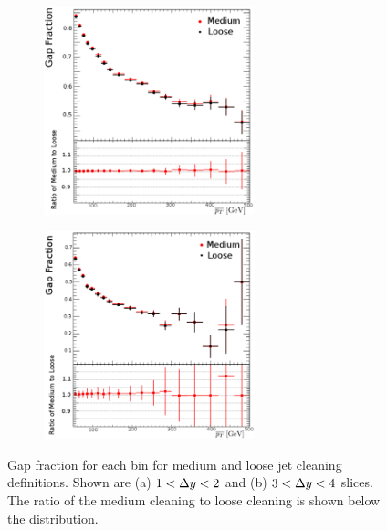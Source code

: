 \begin{figure}
\centering
        \begin{subfigure}[b]{0.5\textwidth}
                \centering
                \includegraphics[height=6cm,width=\textwidth]{figures/GBJ1/JetCleaning/RatioGF_selA_DeltaY_1_2-Edit.eps}
        \end{subfigure}%
        \begin{subfigure}[b]{0.5\textwidth}
                \centering
                \includegraphics[height=6cm,width=\textwidth]{figures/GBJ1/JetCleaning/RatioGF_selA_DeltaY_3_4-Edit.eps}
        \end{subfigure}%

\caption[Effect of jet cleaning on the gap fraction versus \dy{}]{
Gap fraction for each \ptb{} bin for medium and loose jet cleaning definitions. 
Shown are (a) $1<\mbox{$\Delta y$}{}<2$ and (b) $3<\mbox{$\Delta y$}{}<4$ slices.
The ratio of the medium cleaning to loose cleaning is shown below the distribution.
\label{JetCleanGF_pt}}
\end{figure}




